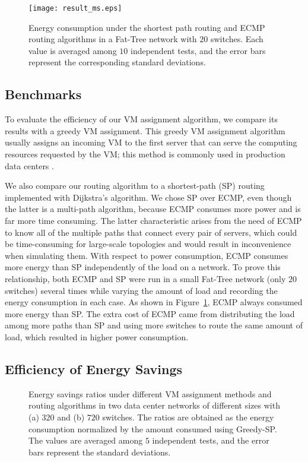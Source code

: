 \documentclass[journal,single-space,two column,twoside,10pt]{IEEEtran}
\begin{document}
\begin{figure}[!t]
	\centering
	\texttt{[image: result\_ms.eps]}
	\caption{\label{fig:result:ms}Energy consumption under the shortest path routing and ECMP routing algorithms in a Fat-Tree network with $20$ switches. Each value is averaged among $10$ independent tests, and the error bars represent the corresponding standard deviations.}
\end{figure}


\subsection{Benchmarks}

To evaluate the efficiency of our VM assignment algorithm, we compare its results with a greedy VM assignment. This greedy VM assignment algorithm usually assigns an incoming VM to the first server that can serve the computing resources requested by the VM; this method is commonly used in production data centers \cite{Meng_Pappas-2010}.

We also compare our routing algorithm to a shortest-path (SP) routing implemented with Dijkstra's algorithm. We chose SP over ECMP, even though the latter is a multi-path algorithm, because ECMP consumes more power and is far more time consuming. The latter characteristic arises from the need of ECMP to know all of the multiple paths that connect every pair of servers, which could be time-consuming for large-scale topologies and would result in inconvenience when simulating them. With respect to power consumption, ECMP consumes more energy than SP independently of the load on a network. To prove this relationship, both ECMP and SP were run in a small Fat-Tree network (only $20$ switches) several times while varying the amount of load and recording the energy consumption in each case. As shown in Figure~\ref{fig:result:ms}, ECMP always consumed more energy than SP. The extra cost of ECMP came from distributing the load among more paths than SP and using more switches to route the same amount of load, which resulted in higher power consumption.


\subsection{Efficiency of Energy Savings}
\begin{figure}[!t]
	\centering
	\hspace{-0.1in}
	\caption{\label{fig:result}Energy savings ratios under different VM assignment methods and routing algorithms in two data center networks of different sizes with (a) $320$ and (b) $720$ switches. The ratios are obtained as the energy consumption normalized by the amount consumed using Greedy-SP. The values are averaged among $5$ independent tests, and the error bars represent the standard deviations.}
\end{figure}
\end{document}
